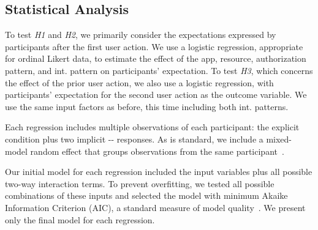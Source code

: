 %



\subsection{Statistical Analysis}

To test \emph{H1} and \emph{H2}, we primarily consider the expectations expressed by participants
after the first user action. We use a logistic regression, appropriate for ordinal Likert data, to 
estimate the effect of the app, resource, authorization pattern, and
int. pattern on participants' expectation. 
%
To test \emph{H3}, which concerns the effect of the prior user action, we also use a logistic regression,
with participants' expectation for the second user action as the outcome variable. We use the same input 
factors as before, this time including both int. patterns.

Each regression includes multiple observations of each participant: the explicit condition plus two implicit 
\never{}-\backgroundonly{}-\backgroundonly{} responses. As is standard, we include
a mixed-model random effect that groups observations from the same participant~\cite{hedeker2008}.

Our initial model for each regression included the input variables plus all possible two-way interaction terms. To 
prevent overfitting, we tested all possible combinations of these inputs and selected the model with 
minimum Akaike Information Criterion (AIC), a standard measure of model quality~\cite{akaike1974}. 
We present only the final model for each regression.  

